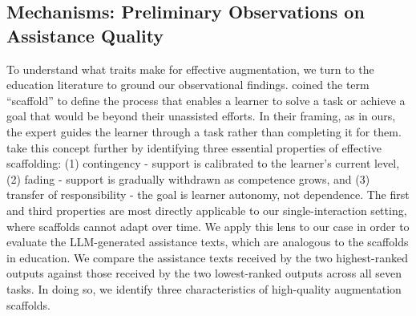 



\subsection{Mechanisms: Preliminary Observations on Assistance Quality}
\label{sec:analysis}

To understand what traits make for effective augmentation, we turn to the education literature to ground our observational findings. \citet{wood1976}  coined the term ``scaffold'' to define the process that enables a learner to solve a task or achieve a goal that would be beyond their unassisted efforts. In their framing, as in ours, the expert guides the learner through a task rather than completing it for them. \citet{vandepol2010} take this concept further by identifying three essential properties of effective scaffolding: (1) contingency - support is calibrated to the learner's current level, (2) fading - support is gradually withdrawn as competence grows, and (3) transfer of responsibility - the goal is learner autonomy, not dependence. The first and third properties are most directly applicable to our single-interaction setting, where scaffolds cannot adapt over time. We apply this lens to our case in order to evaluate the LLM-generated assistance texts, which are analogous to the scaffolds in education. We compare the assistance texts received by the two highest-ranked outputs against those received by the two lowest-ranked outputs across all seven tasks. In doing so, we identify three characteristics of high-quality augmentation scaffolds.

